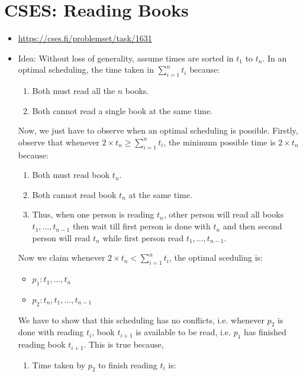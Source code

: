 \documentclass[titlepage, 12pt]{book}
\begin{document}
\section{CSES: Reading Books}
\begin{itemize}
    \item \url{https://cses.fi/problemset/task/1631}
    \item Idea: Without loss of generality, assume times are sorted in $t_1$ to
        $t_n$. In an optimal scheduling, the time taken in $\sum_{i = 1}^n t_i$
        because:
        \begin{enumerate}
            \item Both must read all the $n$ books.
            \item Both cannot read a single book at the same time.
        \end{enumerate}
        Now, we just have to observe when an optimal scheduling is possible.
        Firstly, observe that whenever $2\times t_n \geq \sum_{i = 1}^n t_i$, the
        minimum possible time is $2\times t_n$ because:
        \begin{enumerate}
            \item Both must read book $t_n$.
            \item Both cannot read book $t_n$ at the same time.
            \item Thus, when one person is reading $t_n$, other person will read
                all books $t_1,\dots,t_{n - 1}$ then wait till first person is
                done with $t_n$ and then second person will read $t_n$ while
                first person read $t_1,\dots,t_{n - 1}$.
        \end{enumerate}
        Now we claim whenever $2\times t_n < \sum_{i = 1}^n t_i$, the optimal
        sceduling is:
        \begin{itemize}
            \item $p_1: t_1,\dots,t_n$
            \item $p_2: t_n, t_1, \dots, t_{n - 1}$
        \end{itemize}
        We have to show that this scheduling has no conflicts, i.e. whenever
        $p_2$ is done with reading $t_i$, book $t_{i + 1}$ is available to be
        read, i.e. $p_1$ has finished reading book $t_{i + 1}$. This is true
        because,
        \begin{enumerate}
            \item Time taken by $p_2$ to finish reading $t_i$ is:
                \begin{align*}

\end{align*}
\end{enumerate}
\end{itemize}
\end{document}
